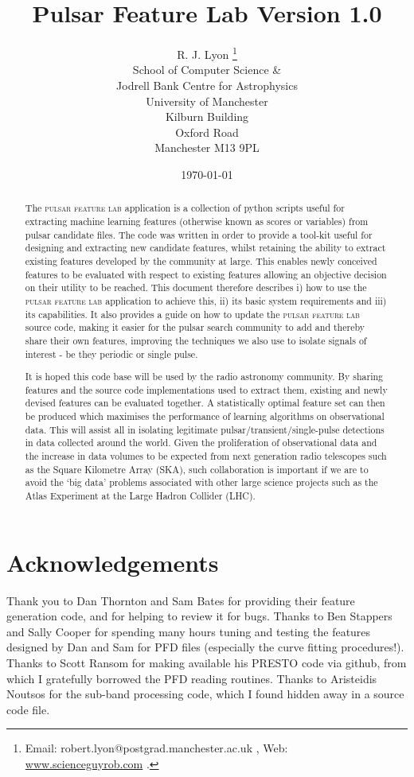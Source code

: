 \documentclass[twoside,a4paper]{refart}
\title{Pulsar Feature Lab Version 1.0}
\author{R. J. Lyon \thanks{Email: robert.lyon@postgrad.manchester.ac.uk , Web: \protect\url{www.scienceguyrob.com} .}\\
School of Computer Science \& \\
Jodrell Bank Centre for Astrophysics\\
University of Manchester\\
Kilburn Building\\
Oxford Road\\
Manchester M13 9PL\\
\date{\today}  
}
\date{}
\begin{document}
\maketitle

\begin{abstract}
The \textsc{pulsar feature lab} application is a collection of python scripts useful for extracting machine learning features (otherwise known as scores or variables) from pulsar candidate files. The code was written in order to provide a tool-kit useful for designing and extracting new candidate features, whilst retaining the ability to extract existing features developed by the community at large. This enables newly conceived features to be evaluated with respect to existing features allowing an objective decision on their utility to be reached. This document therefore describes i) how to use the \textsc{pulsar feature lab} application to achieve this, ii) its basic system requirements and iii) its capabilities. It also provides a guide on how to update the \textsc{pulsar feature lab} source code, making it easier for the pulsar search community to add and thereby share their own features, improving the techniques we also use to isolate signals of interest - be they periodic or single pulse.\newline

It is hoped this code base will be used by the radio astronomy community. By sharing features and the source code implementations used to extract them, existing and newly devised features can be evaluated together. A statistically optimal feature set can then be produced which maximises the performance of learning algorithms on observational data. This will assist all in isolating legitimate pulsar/transient/single-pulse detections in data collected around the world. Given the proliferation of observational data and the increase in data volumes to be expected from next generation radio telescopes such as the Square Kilometre Array (SKA), such collaboration is important if we are to avoid the `big data' problems associated with other large science projects such as the Atlas Experiment at the Large Hadron Collider (LHC).
\end{abstract}
\newpage

\tableofcontents

\newpage



\section{Acknowledgements}
Thank you to Dan Thornton and Sam Bates for providing their feature generation code, and for helping to review it for bugs. Thanks to Ben Stappers and Sally Cooper for spending many hours tuning and testing the features designed by Dan and Sam for PFD files (especially the curve fitting procedures!). Thanks to Scott Ransom for making available his PRESTO code via github, from which I gratefully borrowed the PFD reading routines. Thanks to Aristeidis Noutsos for the sub-band processing code, which I found hidden away in a source code file. 
\end{document}
